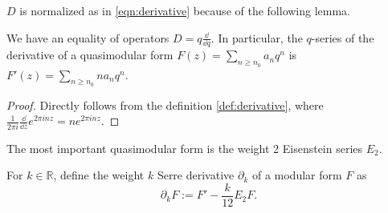 $D$ is normalized as in \eqref{eqn:derivative} because of the following lemma.
\begin{lemma}\label{lemma:der-q-series}
We have an equality of operators $D = q \frac{\dd}{\dd q}$.
In particular, the $q$-series of the derivative of a quasimodular form $F(z) = \sum_{n \ge n_0} a_n q^n$ is $F'(z) = \sum_{n \ge n_0} n a_n q^n$.
\end{lemma}
\begin{proof}
Directly follows from the definition \eqref{def:derivative}, where $\frac{1}{2 \pi i}\frac{\dd}{\dd z}e^{2\pi i n z} = n e^{2\pi i n z}$.
\end{proof}


The most important quasimodular form is the weight 2 Eisenstein series $E_2$.


\begin{definition}\label{def:serre-der}
For $k \in \mathbb{R}$, define the weight $k$ Serre derivative $\partial_{k}$ of a modular form $F$ as
\begin{equation}\label{eqn:serre-der}
    \partial_{k}F := F' - \frac{k}{12} E_2 F.
\end{equation}
\end{definition}


